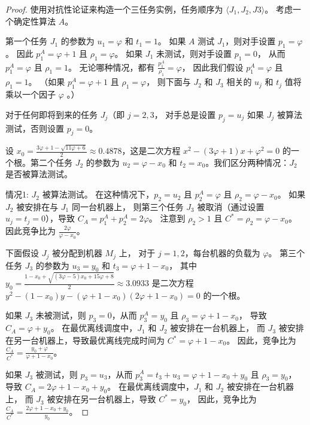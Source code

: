 \begin{proof}

使用对抗性论证来构造一个三任务实例，任务顺序为 \( \langle J_1, J_2, J3 \rangle \)。
考虑一个确定性算法 \( A \)。

第一个任务 \( J_1 \) 的参数为 \( u_1 = \varphi \) 和 \( t_1 = 1 \)。
如果 \( A \) 测试 \( J_1 \)，则对手设置 \( p_1 = \varphi \)。
因此 \( p^A_1 = \varphi + 1 \) 且 \( \rho_1 = \varphi \)。
如果 \( J_1 \) 未测试，则对手设置 \( p_1 = 0 \)，
从而 \( p^A_1 = \varphi \) 且 \( \rho_1 = 1 \)。
无论哪种情况，都有 \( \frac{p^A_1}{\rho_1} = \varphi \)，
因此我们假设 \( p^A_1 = \varphi \) 且 \( \rho_1 = 1 \)。
（如果 \( p^A_1 = \varphi + 1 \) 且 \( \rho_1 = \varphi \)，
则下面与 \( J_2 \) 和 \( J_3 \) 相关的 \( u_j \) 和 \( t_j \) 值将乘以一个因子 \( \varphi \) 。）

对于任何即将到来的任务 \( J_j \)（即 \( j = 2, 3 \)，
对手总是设置 \( p_j = u_j \) 如果 \( J_j \) 被算法测试，否则设置 \( p_j = 0 \)。

设 \( x_0 = \frac{3\varphi + 1 - \sqrt{11\varphi + 6}}{2} \approx 0.4878 \)，这是二次方程 \( x^2 - (3\varphi + 1)x + \varphi^2 = 0 \) 的一个根。第二个任务 \( J_2 \) 的参数为 \( u_2 = \varphi - x_0 \) 和 \( t_2 = x_0 \)。我们区分两种情况：\( J_2 \) 是否被算法测试。

情况1: \( J_2 \) 被算法测试。
在这种情况下，\( p_2 = u_2 \) 且 \( p^A_2 = \varphi \) 且 \( \rho_2 = \varphi - x_0 \)。
如果 \( J_2 \) 被安排在与 \( J_1 \) 同一台机器上，
则第三个任务 \( J_3 \) 被取消（通过设置 \( u_j = t_j = 0 \)），导致 \( C_A = p^A_1 + p^A_2 = 2\varphi \)。
注意到 \( \rho_2 > 1 \) 且 \( C^* = \rho_2 = \varphi - x_0 \)。
因此竞争比为 \( \frac{2\varphi}{\varphi - x_0} \)。

下面假设 \( J_j \) 被分配到机器 \( M_j \) 上，
对于 \( j = 1, 2 \)，每台机器的负载为 \( \varphi \)。
第三个任务 \( J_3 \) 的参数为 \( u_3 = y_0 \) 和 \( t_3 = \varphi + 1 - x_0 \)，
其中 \( y_0 = \frac{1 - x_0 + \sqrt{(3\varphi - 5)x_0 + 15\varphi + 8}}{2} \approx 3.0933 \) 
是二次方程 \( y^2 - (1 - x_0)y - (\varphi + 1 - x_0)(2\varphi + 1 - x_0) = 0 \) 的一个根。

如果 \( J_3 \) 未被测试，则 \( p_3 = 0 \)，从而 \( p^A_3 = y_0 \) 且 \( \rho_3 = \varphi + 1 - x_0 \)，
导致 \( C_A = \varphi + y_0 \)。
在最优离线调度中，\( J_1 \) 和 \( J_2 \) 被安排在一台机器上，
而 \( J_3 \) 被安排在另一台机器上，导致最优离线完成时间为 \( C^* = \varphi + 1 - x_0 \)。
因此，竞争比为 \( \frac{C_A}{C^*} = \frac{y_0 + \varphi}{\varphi + 1 - x_0} \)。

如果 \( J_3 \) 被测试，则 \( p_3 = u_3 \)，从而 \( p^A_3 = t_3 + u_3 = \varphi + 1 - x_0 + y_0 \) 且 \( \rho_3 = y_0 \)，
导致 \( C_A = 2\varphi + 1 - x_0 + y_0 \)。
在最优离线调度中，\( J_1 \) 和 \( J_2 \) 被安排在一台机器上，
而 \( J_3 \) 被安排在另一台机器上，导致 \( C^* = y_0 \)，
因此，竞争比为 \( \frac{C_A}{C^*} = \frac{2\varphi + 1 - x_0 + y_0}{y_0} \)。


\end{proof}
